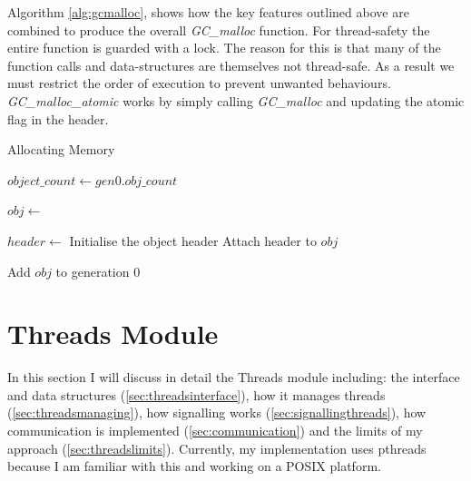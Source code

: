 \documentclass[../diss.tex]{subfiles}
\begin{document}
Algorithm \ref{alg:gcmalloc}, shows how the key features outlined above are combined to produce the overall \emph{GC\_malloc} function. For thread-safety the entire function is guarded with a lock. The reason for this is that many of the function calls and data-structures are themselves not thread-safe. As a result we must restrict the order of execution to prevent unwanted behaviours. \emph{GC\_malloc\_atomic} works by simply calling \emph{GC\_malloc} and updating the atomic flag in the header.

\begin{algorithm}
\caption{Allocating Memory}
\label{alg:gcmalloc}
\begin{algorithmic}


\State {}

\State $object\_count\gets gen0.obj\_count$
\State {}
\EndIf

\State
\State $obj\gets$ 

\State
\State $header\gets$ Initialise the object header
\State Attach header to $obj$

\State
\State {}
\State Add $obj$ to generation 0

\State {}

\EndFunction

\end{algorithmic}
\end{algorithm}


\section{Threads Module} \label{sec:threads}

In this section I will discuss in detail the Threads module including: the interface and data structures (\cref{sec:threadsinterface}), how it manages threads (\cref{sec:threadsmanaging}), how signalling works (\cref{sec:signallingthreads}), how communication is implemented (\cref{sec:communication}) and the limits of my approach (\cref{sec:threadslimits}). Currently, my implementation uses pthreads because I am familiar with this and working on a POSIX platform. 
\end{document}
